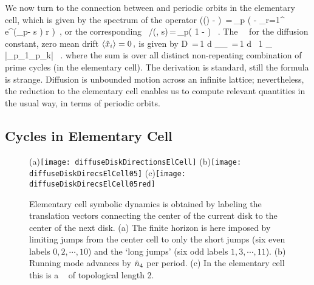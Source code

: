 \documentclass[aps,pre,showpacs,preprint,groupedaddress,floatfix]{revtex4-1}
\begin{document}
We now turn to the connection between  and periodic orbits in the elementary cell, which is given by the spectrum of the operator
\beq
\det(\eigenvL (\beta) - \Aop)  \,=\,\prod_{p}
\exp \left( - {
               \sum_{r=1}^
               {
                e^{(\beta \cdot \hn_p- s ) r}
 \over  {}
                }
              } \right)
\,,
or the corresponding \dzeta\
/\zeta(\beta, s)\,=\,\prod_{p}\left( 1 -  \right)
~.
\label{zeta-diff}
\eeq
The \dzeta\ \cycForm\ for the diffusion constant, zero mean drift
$
\left\langle { \hat{x}_i } \right\rangle = 0
\,,
$
is given by
\beq
D \,=\,{1  d} { _\zeta \over \expct{\period{}}_\zeta }
  \,=\,{1 \over 2 d } \, {1 \over \expct{\period{}}_\zeta}
  \sumprime {}
  {|\ExpaEig_{p_1}\cdots \ExpaEig_{p_k}|}
\, .
\label{(17)}
\eeq
where the sum is over all distinct non-repeating combination of prime cycles (in the elementary cell). The derivation is standard, still the formula is strange. Diffusion is unbounded motion across an infinite lattice; nevertheless, the reduction to the elementary cell enables us to compute relevant quantities in the usual way, in terms of periodic orbits.

\subsection{Cycles in Elementary Cell}
\begin{figure}
\begin{center}
(a)\texttt{[image: diffuseDiskDirectionsElCell]}
(b)\texttt{[image: diffuseDiskDirecsElCell05]}
(c)\texttt{[image: diffuseDiskDirecsElCell05red]}
\end{center}
\caption{
Elementary cell symbolic dynamics is obtained by labeling the translation vectors connecting the center of the current disk to the center of the next disk. (a) The finite horizon is here imposed by limiting jumps from the center cell to only the short jumps (six even labels $0, 2,\cdots,10$) and the `long jumps' (six odd labels $1, 3,\cdots,11$). (b) Running mode  advances by $\hat n_4$ per period. (c) In the elementary cell this is a \po\ 
    of topological length 2.
    }
\label{fig-diskDirectionsElCell}
\end{figure}
\end{document}
